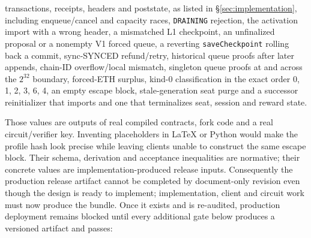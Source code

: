 \documentclass[a4paper,11pt]{article}
\newcommand{\code}[1]{\nolinkurl{#1}}
\begin{document}
\begin{itemize}
  transactions, receipts, headers and poststate, as listed in
  \S\ref{sec:implementation}, including enqueue/cancel and capacity races,
  \code{DRAINING} rejection, the activation import with a wrong header, a
  mismatched L1 checkpoint, an unfinalized proposal or a nonempty V1 forced
  queue, a reverting \code{saveCheckpoint} rolling back a commit, sync-SYNCED
  refund/retry, historical queue proofs after later appends, chain-ID
  overflow/local mismatch, singleton queue proofs at and across the $2^{32}$
  boundary, forced-ETH surplus, kind-0 classification in the exact order
  0, 1, 2, 3, 6, 4, an empty escape block, stale-generation seat purge and a
  successor reinitializer that imports and one that terminalizes seat,
  session and reward state.
\end{itemize}

Those values are outputs of real compiled contracts, fork code and a real
circuit/verifier key.  Inventing placeholders in LaTeX or Python would make the
profile hash look precise while leaving clients unable to construct the same
escape block.  Their schema, derivation and acceptance inequalities are
normative; their concrete values are implementation-produced release inputs.
Consequently the production release artifact cannot be completed by
document-only revision even though the design is ready to implement;
implementation, client and circuit work must now produce the bundle.  Once it
exists and is re-audited, production deployment remains blocked until every
additional gate below produces a versioned artifact and passes:
\end{document}
